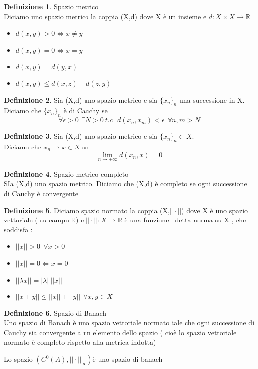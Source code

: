 \documentclass{article}
\theoremstyle{definition}
\newtheorem*{definizione}{Definizione}
\newcommand{\R}{\mathbb{R}}
\newcommand{\la}{\lambda}
\begin{document}
	\begin{definizione}
	Spazio metrico \\
	Diciamo uno spazio metrico la coppia (X,d) dove X è un insieme e $d:X\times X\rightarrow\R$
	\begin{itemize}
		\item $d(x,y)>0 \iff x\neq y$
		\item $d(x,y)=0 \iff x=y$
		\item $d(x,y)=d(y,x)$
		\item $d(x,y) \leq d(x,z)+d(z,y) $ 
	\end{itemize}
\end{definizione}
\begin{definizione}
	Sia (X,d) uno spazio metrico e sia $\{x_n\}_n$ una successione in X.\\
	Diciamo che $\{x_n\}_n$ è di Cauchy se $$\forall \epsilon > 0 \ \ \exists N >0 \ t.c \ \ \ d(x_n,x_m)<\epsilon \ \ \forall n,m >N$$
\end{definizione}
\begin{definizione}
Sia (X,d) uno spazio metrico e sia $\{x_n\}_n\subset X$. \\Diciamo che $x_n\rightarrow x\in X$ se $$\lim_{n\rightarrow +\infty}d(x_n,x)=0$$
\end{definizione}
\begin{definizione}
Spazio metrico completo \\
SIa (X,d) uno spazio metrico. Diciamo che (X,d) è completo se ogni successione di Cauchy è convergente 
\end{definizione}
\begin{definizione}
Diciamo spazio normato la coppia (X,$||\cdot||$) dove X è uno spazio vettoriale ( su campo $\R$) e $||\cdot||:X\rightarrow\R$ è una funzione , detta norma su X , che soddisfa :
\begin{itemize}
\item $||x||>0 \ \ \forall x>0$
\item $||x||=0 \iff x=0$
\item $||\la x||=|\la|\ ||x||$
\item $||x+y||\leq ||x||+||y||\ \ \forall x,y\in X$
\end{itemize}
\end{definizione}
\begin{definizione}
Spazio di Banach \\
Uno spazio di Banach è uno spazio vettoriale normato tale che ogni successione di Cauchy sia convergente a un elemento dello spazio ( cioè lo spazio vettoriale normato è completo rispetto alla metrica indotta)
\end{definizione}
\begin{teo*}{}
	Lo spazio $(C^0(A),||\cdot||_{\infty}) $è uno spazio di banach
\end{teo*}
\end{document}
